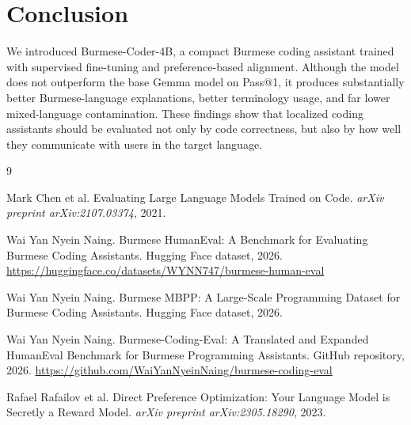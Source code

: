 \documentclass[11pt]{article}
\begin{document}
\section{Conclusion}
We introduced Burmese-Coder-4B, a compact Burmese coding assistant trained with supervised fine-tuning and preference-based alignment. Although the model does not outperform the base Gemma model on Pass@1, it produces substantially better Burmese-language explanations, better terminology usage, and far lower mixed-language contamination. These findings show that localized coding assistants should be evaluated not only by code correctness, but also by how well they communicate with users in the target language.

\begin{thebibliography}{9}

Mark Chen et al.
\newblock Evaluating Large Language Models Trained on Code.
\newblock \emph{arXiv preprint arXiv:2107.03374}, 2021.

Wai Yan Nyein Naing.
\newblock Burmese HumanEval: A Benchmark for Evaluating Burmese Coding Assistants.
\newblock Hugging Face dataset, 2026.
\newblock \url{https://huggingface.co/datasets/WYNN747/burmese-human-eval}

Wai Yan Nyein Naing.
\newblock Burmese MBPP: A Large-Scale Programming Dataset for Burmese Coding Assistants.
\newblock Hugging Face dataset, 2026.

Wai Yan Nyein Naing.
\newblock Burmese-Coding-Eval: A Translated and Expanded HumanEval Benchmark for Burmese Programming Assistants.
\newblock GitHub repository, 2026.
\newblock \url{https://github.com/WaiYanNyeinNaing/burmese-coding-eval}

Rafael Rafailov et al.
\newblock Direct Preference Optimization: Your Language Model is Secretly a Reward Model.
\newblock \emph{arXiv preprint arXiv:2305.18290}, 2023.

\end{thebibliography}
\end{document}
